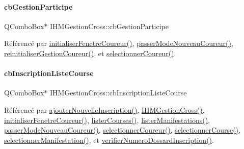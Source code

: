 \mbox{\label{class_i_h_m_gestion_cross_a89aff3b1c5d5198dd7aaecd932331e0d}} 
\paragraph{\texorpdfstring{cb\+Gestion\+Participe}{cbGestionParticipe}}
{\footnotesize\ttfamily Q\+Combo\+Box$\ast$ I\+H\+M\+Gestion\+Cross\+::cb\+Gestion\+Participe\hspace{0.3cm}{\ttfamily [private]}}



Référencé par \hyperlink{class_i_h_m_gestion_cross_aa5d9de499a66e52b843c4ef4c6074a60}{initialiser\+Fenetre\+Coureur()}, \hyperlink{class_i_h_m_gestion_cross_ac8f336c95a5f0c9eb8a4bc1c4bb83445}{passer\+Mode\+Nouveau\+Coureur()}, \hyperlink{class_i_h_m_gestion_cross_a85c44933ec0dcbb591e01c832063367e}{reinitialiser\+Gestion\+Coureur()}, et \hyperlink{class_i_h_m_gestion_cross_ad71963d500fd61995fdae94e833db163}{selectionner\+Coureur()}.

\mbox{\label{class_i_h_m_gestion_cross_aff44e6f1a225ee5b55783afe72049f83}} 
\paragraph{\texorpdfstring{cb\+Inscription\+Liste\+Course}{cbInscriptionListeCourse}}
{\footnotesize\ttfamily Q\+Combo\+Box$\ast$ I\+H\+M\+Gestion\+Cross\+::cb\+Inscription\+Liste\+Course\hspace{0.3cm}{\ttfamily [private]}}



Référencé par \hyperlink{class_i_h_m_gestion_cross_af0165d32344af78b4edce59f88c90ff6}{ajouter\+Nouvelle\+Inscription()}, \hyperlink{class_i_h_m_gestion_cross_a2c62fd83326a87456a403f46acc408c8}{I\+H\+M\+Gestion\+Cross()}, \hyperlink{class_i_h_m_gestion_cross_aa5d9de499a66e52b843c4ef4c6074a60}{initialiser\+Fenetre\+Coureur()}, \hyperlink{class_i_h_m_gestion_cross_a34567afe3e94862ebd9af51528dedb65}{lister\+Courses()}, \hyperlink{class_i_h_m_gestion_cross_a0eadd8592c966c89bf7b5a25a0ae7589}{lister\+Manifestations()}, \hyperlink{class_i_h_m_gestion_cross_ac8f336c95a5f0c9eb8a4bc1c4bb83445}{passer\+Mode\+Nouveau\+Coureur()}, \hyperlink{class_i_h_m_gestion_cross_ad71963d500fd61995fdae94e833db163}{selectionner\+Coureur()}, \hyperlink{class_i_h_m_gestion_cross_ae555b32462455a2cdaf0f8dc2e016d14}{selectionner\+Course()}, \hyperlink{class_i_h_m_gestion_cross_a60fc58610d01534b3df66ac7dd76b4dc}{selectionner\+Manifestation()}, et \hyperlink{class_i_h_m_gestion_cross_a164be2d046cf18ee03e3939d03a5580d}{verifier\+Numero\+Dossard\+Inscription()}.

